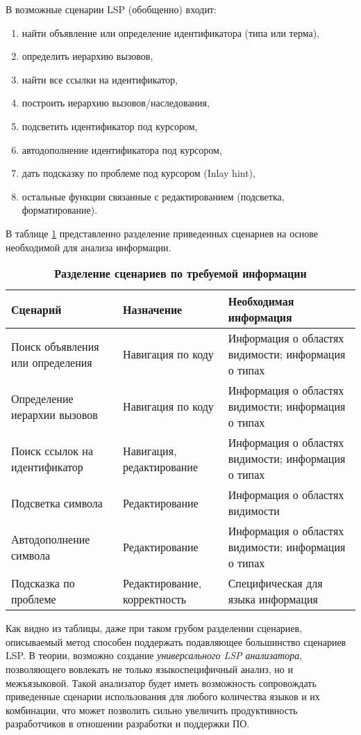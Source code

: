В возможные сценарии LSP (обобщенно) входит:
\begin{enumerate}[1)]
    \item найти объявление или определение идентификатора (типа или терма),
    \item определить иерархию вызовов,
    \item найти все ссылки на идентификатор,
    \item построить иерархию вызовов/наследования,
    \item подсветить идентификатор под курсором,
    \item автодополнение идентификатора под курсором,
    \item дать подсказку по проблеме под курсором (Inlay hint),
    \item остальные функции связанные с редактированием (подсветка, форматирование).
\end{enumerate}


В таблице \ref{lsp_functionality} представленно разделение приведенных сценариев на основе необходимой для анализа информации.
\begin{table}[H]
    \caption{\textbf{Разделение сценариев по требуемой информации}}\label{lsp_functionality}
    \begin{tabular}{|p{5.0cm}|p{5.0cm}|p{5.0cm}|}
    \hline \textbf{Сценарий} & \textbf{Назначение} & \textbf{Необходимая информация} \\
    \hline Поиск объявления или определения & Навигация по коду & Информация о областях видимости; информация о типах \\
    \hline Определение иерархии вызовов & Навигация по коду & Информация о областях видимости; информация о типах \\
    \hline Поиск ссылок на идентификатор & Навигация, редактирование & Информация о областях видимости; информация о типах \\
    \hline Подсветка символа & Редактирование & Информация о областях видимости \\
    \hline Автодополнение символа & Редактирование & Информация о областях видимости; информация о типах \\
    \hline Подсказка по проблеме & Редактирование, корректность & Специфическая для языка информация \\
    \hline
    \end{tabular}
\end{table}

Как видно из таблицы, даже при таком грубом разделении сценариев, описываемый метод способен поддержать подавляющее
большинство сценариев LSP. В теории, возможно создание \textit{универсального LSP анализатора}, позволяющего вовлекать не только
языкоспецифичный анализ, но и межъязыковой. Такой анализатор будет иметь возможность сопровождать приведенные сценарии использования
для любого количества языков и их комбинации, что может позволить сильно увеличить продуктивность разработчиков в отношении
разработки и поддержки ПО.

\clearpage